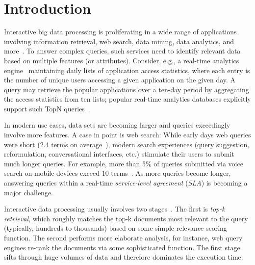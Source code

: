 \section{Introduction}
\label{sec:intro}

Interactive big data processing is proliferating in a wide range of applications involving
information retrieval, web search, data mining, data analytics, and more~\cite{top-k-survey}. 
To answer complex queries, such services need to identify relevant data based on multiple features (or attributes).  
Consider, e.g., a real-time analytics engine~\cite{flurry} maintaining daily lists of application access statistics, where each entry
is the number of unique users accessing a given application on the given day.  
A query may retrieve the popular applications over a ten-day period by aggregating the access statistics from ten lists;
popular real-time analytics databases explicitly support such TopN queries~\cite{druid-topN}.

In modern use cases,  data sets are becoming larger and queries exceedingly  involve more features. 
A case in point is web search:  
While  early days web queries were short (2.4 terms on average~\cite{Spink:2001:SWP:362968.362979}), 
modern search experiences (query suggestion, reformulation, conversational interfaces, etc.) stimulate their users to submit much longer queries. 
For example, more than 5\% of queries submitted via voice search on mobile devices exceed 10 terms~\cite{sigir/Guy16}. 
As more queries become longer, answering queries within a real-time \emph{service-level agreement} ({\em SLA}) 
is becoming a major challenge.  

Interactive data processing   usually involves two stages~\cite{Wang:2011}. 
The first  is \emph{top-k retrieval}, which roughly matches the top-k documents most relevant to the query 
(typically, hundreds to thousands) based on some simple relevance scoring function. 
The second  performs more elaborate analysis, for instance,   web query engines 
re-rank the  documents via some sophisticated function. 
The first stage  sifts through huge volumes of data and therefore dominates the execution time. 

